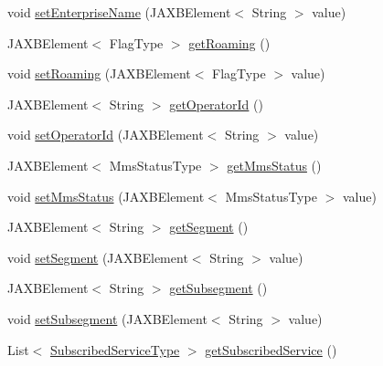 \begin{DoxyCompactItemize}
void \hyperlink{classcom_1_1telefonica_1_1schemas_1_1unica_1_1rest_1_1directory_1_1v1_1_1UserProfileType_a21407a9083dd881d0d068819a2ebf12b}{setEnterpriseName} (JAXBElement$<$ String $>$ value)
\item 
JAXBElement$<$ FlagType $>$ \hyperlink{classcom_1_1telefonica_1_1schemas_1_1unica_1_1rest_1_1directory_1_1v1_1_1UserProfileType_a6516aae54ff49d231d4596060bfaf786}{getRoaming} ()
\item 
void \hyperlink{classcom_1_1telefonica_1_1schemas_1_1unica_1_1rest_1_1directory_1_1v1_1_1UserProfileType_a86cd7e91bbc80e92434434f35ca62b48}{setRoaming} (JAXBElement$<$ FlagType $>$ value)
\item 
JAXBElement$<$ String $>$ \hyperlink{classcom_1_1telefonica_1_1schemas_1_1unica_1_1rest_1_1directory_1_1v1_1_1UserProfileType_a59f79c52cc6230ab097e825a26a75f12}{getOperatorId} ()
\item 
void \hyperlink{classcom_1_1telefonica_1_1schemas_1_1unica_1_1rest_1_1directory_1_1v1_1_1UserProfileType_a523d61e3fb88a4904cc378726e6e6cf0}{setOperatorId} (JAXBElement$<$ String $>$ value)
\item 
JAXBElement$<$ MmsStatusType $>$ \hyperlink{classcom_1_1telefonica_1_1schemas_1_1unica_1_1rest_1_1directory_1_1v1_1_1UserProfileType_a2dad8f9c8cd5b9c87e4a1066c916fe69}{getMmsStatus} ()
\item 
void \hyperlink{classcom_1_1telefonica_1_1schemas_1_1unica_1_1rest_1_1directory_1_1v1_1_1UserProfileType_aee80953e1b9dea71f364ef1f2dfe7c4d}{setMmsStatus} (JAXBElement$<$ MmsStatusType $>$ value)
\item 
JAXBElement$<$ String $>$ \hyperlink{classcom_1_1telefonica_1_1schemas_1_1unica_1_1rest_1_1directory_1_1v1_1_1UserProfileType_a691981a6317279a2e200c48dce061504}{getSegment} ()
\item 
void \hyperlink{classcom_1_1telefonica_1_1schemas_1_1unica_1_1rest_1_1directory_1_1v1_1_1UserProfileType_a11e371d3486e23598cc244f7884564d8}{setSegment} (JAXBElement$<$ String $>$ value)
\item 
JAXBElement$<$ String $>$ \hyperlink{classcom_1_1telefonica_1_1schemas_1_1unica_1_1rest_1_1directory_1_1v1_1_1UserProfileType_a4c5e274dcaacbb623471a1453cf4bebb}{getSubsegment} ()
\item 
void \hyperlink{classcom_1_1telefonica_1_1schemas_1_1unica_1_1rest_1_1directory_1_1v1_1_1UserProfileType_a935c7a74dd4732a19f209be3809cb380}{setSubsegment} (JAXBElement$<$ String $>$ value)
\item 
List$<$ \hyperlink{classcom_1_1telefonica_1_1schemas_1_1unica_1_1rest_1_1directory_1_1v1_1_1SubscribedServiceType}{SubscribedServiceType} $>$ \hyperlink{classcom_1_1telefonica_1_1schemas_1_1unica_1_1rest_1_1directory_1_1v1_1_1UserProfileType_a6527ab37f0d2d2cd9421b678b05c74ce}{getSubscribedService} ()

\end{DoxyCompactItemize}
